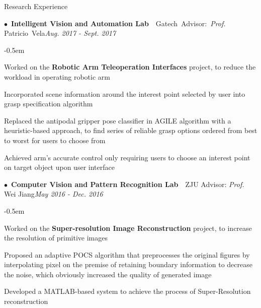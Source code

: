 \documentclass{resume} %
\begin{document}

\begin{rSection}{Research Experience}


\begin{spacing}{0.4}
$\bullet$~{\bf Intelligent Vision and Automation Lab}~~{Gatech~Advisor:~{\em Prof.} Patricio~Vela}\hfill{\em Aug. 2017 - Sept. 2017}\smallskip\\
\end{spacing}
\begin{list}{--}{\leftmargin=1em}
	\itemsep -0.5em \vspace{-0.5em}
\item Worked on the {\bfseries Robotic Arm Teleoperation Interfaces} project, to reduce the workload in operating robotic arm
\item Incorporated scene information around the interest point selected by user into grasp specification algorithm
\item Replaced the antipodal gripper pose classifier in AGILE algorithm with a heuristic-based approach, to find series of reliable grasp options ordered from best to worst for users to choose from
\item Achieved arm's accurate control only requiring users to choose an interest point on target object upon user interface
	
\end{list}



\begin{spacing}{0.4}
$\bullet$~{\bf Computer Vision and Pattern Recognition Lab}~~{ZJU Advisor: {\em Prof.} Wei Jiang}\hfill{\em May 2016 - Dec. 2016}\smallskip\\
\end{spacing}
\begin{list}{--}{\leftmargin=1em}
	\itemsep -0.5em \vspace{-0.5em}
\item Worked on the {\bfseries Super-resolution Image Reconstruction} project, to increase the resolution of primitive images
\item Proposed an adaptive POCS algorithm that preprocesses the original figures by interpolating pixel on the premise of retaining boundary information to decrease the noise, which obviously increased the quality of generated image
\item Developed a MATLAB-based system to achieve the process of Super-Resolution reconstruction
\end{list}


\end{rSection}
\end{document}
